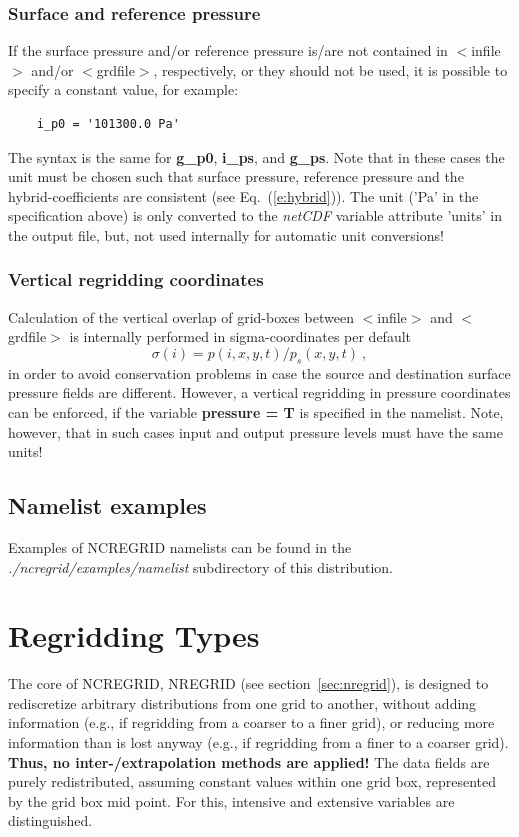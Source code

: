 \documentclass[12pt, a4paper]{article}
\begin{document}
\subsubsection{Surface and reference pressure}
If the surface pressure and/or reference pressure is/are not contained
in $<$infile$>$ and/or $<$grdfile$>$, respectively, or they should not
be used, it is possible to specify a constant value, for example:
\begin{verbatim}
    i_p0 = '101300.0 Pa'
\end{verbatim}
The syntax is the same for {\bf g\_p0}, {\bf i\_ps}, and {\bf g\_ps}.
Note that in these cases the unit must be chosen such that surface pressure,
reference pressure and the hybrid-coefficients are consistent
(see Eq.~(\ref{e:hybrid})).
The unit ('Pa' in the specification above) is only converted to
the {\it netCDF} variable attribute 'units' in the output file,
but, not used internally for automatic unit conversions!

\subsubsection{Vertical regridding coordinates}
Calculation of the vertical overlap of grid-boxes between $<$infile$>$ and
$<$grdfile$>$ is internally performed in sigma-coordinates per default
\begin{equation}
 \sigma(i) = p(i,x,y,t)/p_s(x,y,t)~,
\end{equation}
in order to avoid conservation problems in case the source and destination
surface pressure fields are different.
However, a vertical regridding in pressure coordinates can be
enforced, if the variable {\bf pressure = T} is specified in the namelist.
Note, however, that in such cases input and output
pressure levels must have the same units!

\subsection{Namelist examples}
Examples of NCREGRID namelists can be found in the\\
{\it ./ncregrid/examples/namelist}
subdirectory of this distribution.


\section{Regridding Types}
\label{sec:rgtypes}
The core of NCREGRID, NREGRID (see section~\ref{sec:nregrid}),
is designed to rediscretize arbitrary distributions from
one grid to another, without adding information (e.g., if regridding from
a coarser to a finer grid), or reducing more information
than is lost anyway (e.g., if regridding from a finer to a coarser
grid). {\bf Thus, no inter-/extrapolation methods are applied!}
The data fields are purely redistributed, assuming constant values
within one grid box,
represented by the grid box mid point. For this, intensive and
extensive variables are distinguished.
\end{document}
